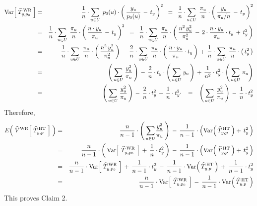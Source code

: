 \begin{eqnarray*}
\textnormal{Var}\!\left[\;\widehat{T}^{\,\textnormal{WR}}_{y,p_{0}}\;\right]
& = &
	\dfrac{1}{n}\cdot
	\underset{u \in U}{\sum}\;\,
	p_{0}(u)\cdot\left(\,\dfrac{y_{u}}{p_{0}(u)}\,-\,t_{y}\,\right)^{2}
\;\; = \;\;
	\dfrac{1}{n}\cdot
	\underset{u \in U}{\sum}\;\,
	\dfrac{\pi_{u}}{n}\cdot\left(\,\dfrac{y_{u}}{\pi_{u}/n}\,-\,t_{y}\,\right)^{2}
\\
& = &
	\dfrac{1}{n}\cdot
	\underset{u \in U}{\sum}\;\,
	\dfrac{\pi_{u}}{n}\cdot\left(\,\dfrac{n\cdot y_{u}}{\pi_{u}}\,-\,t_{y}\,\right)^{2}
\;\; = \;\;
	\dfrac{1}{n}\cdot
	\underset{u \in U}{\sum}\;\,
	\dfrac{\pi_{u}}{n}\cdot\left(\,
		\dfrac{n^{2}\,y_{u}^{2}}{\pi_{u}^{2}}
		\,-\,
		2\cdot\dfrac{n\cdot y_{u}}{\pi_{u}}\cdot t_{y}
		\,+\,
		t_{y}^{2}
		\,\right)
\\
& = &
	\dfrac{1}{n}\cdot
	\underset{u \in U}{\sum}\;\,
	\dfrac{\pi_{u}}{n}\cdot\left(\,
		\dfrac{n^{2}\,y_{u}^{2}}{\pi_{u}^{2}}
		\,\right)
	\,-\,
	\dfrac{2}{n}\cdot
		\underset{u \in U}{\sum}\;\,
		\dfrac{\pi_{u}}{n}\cdot\left(\,
			\dfrac{n\cdot y_{u}}{\pi_{u}}\cdot t_{y}
			\,\right)
	\,+\,
		\dfrac{1}{n}\cdot
		\underset{u \in U}{\sum}\;\,
		\dfrac{\pi_{u}}{n}\cdot\left(\,
			t_{y}^{2}
			\,\right)
\\
& = &
	\left(\,
	\underset{u \in U}{\sum}\;
		\dfrac{y_{u}^{2}}{\pi_{u}}
		\,\right)
	\,-\,
	\dfrac{2}{n}\cdot t_{y}\cdot
		\left(\,\underset{u \in U}{\sum}\;y_{u}\,\right)
	\,+\,
		\dfrac{1}{n^{2}} \cdot t_{y}^{2} \cdot
		\left(\,\underset{u \in U}{\sum}\;\pi_{u}\right)
\\
& = &
	\left(\,
	\underset{u \in U}{\sum}\;
		\dfrac{y_{u}^{2}}{\pi_{u}}
		\,\right)
	\,-\,
	\dfrac{2}{n}\cdot t_{y}^{2}
	\,+\,
	\dfrac{1}{n} \cdot t_{y}^{2} \cdot
\;\;\; = \;\;\;
	\left(\,
	\underset{u \in U}{\sum}\;
		\dfrac{y_{u}^{2}}{\pi_{u}}
		\,\right)
	\,-\,
	\dfrac{1}{n}\cdot t_{y}^{2}
\end{eqnarray*}
Therefore,
\begin{eqnarray*}
E\!\left(\;\widehat{V}^{\textnormal{WR}}\!\left[\;\widehat{T}^{\,\textnormal{HT}}_{y,p}\;\right]\;\right)
& = &
	\dfrac{n}{n-1} \cdot \left(\,\underset{u \in U}{\sum}\dfrac{y_{u}^{2}}{\pi_{u}}\,\right)
	\,-\,
	\dfrac{1}{n-1} \cdot
	\left(
		\Var\!\left(\,\widehat{T}^{\,\textnormal{HT}}_{y,p}\,\right)
		+\,
		t_{y}^{2}
		\,\right)
\\
& = &
	\dfrac{n}{n-1} \cdot \left(\,
		\Var\!\left[\;\widehat{T}^{\,\textnormal{WR}}_{y,p_{0}}\;\right]
		\,+\,
		\dfrac{1}{n}\cdot t_{y}^{2}
		\,\right)
	\,-\,
	\dfrac{1}{n-1} \cdot
	\left(
		\Var\!\left(\,\widehat{T}^{\,\textnormal{HT}}_{y,p}\,\right)
		+\,
		t_{y}^{2}
		\,\right)
\\
& = &
	\dfrac{n}{n-1} \cdot \Var\!\left[\;\widehat{T}^{\,\textnormal{WR}}_{y,p_{0}}\;\right]
	\,+\,
	\dfrac{1}{n-1}\cdot t_{y}^{2}
	\,-\,
	\dfrac{1}{n-1} \cdot \Var\!\left(\,\widehat{T}^{\,\textnormal{HT}}_{y,p}\,\right)
	\, +\,
	\dfrac{1}{n-1} \cdot t_{y}^{2}
\\
& = &
	\dfrac{n}{n-1} \cdot \Var\!\left[\;\widehat{T}^{\,\textnormal{WR}}_{y,p_{0}}\;\right]
	\,-\,
	\dfrac{1}{n-1} \cdot \Var\!\left(\,\widehat{T}^{\,\textnormal{HT}}_{y,p}\,\right)
\end{eqnarray*}
This proves Claim 2.

